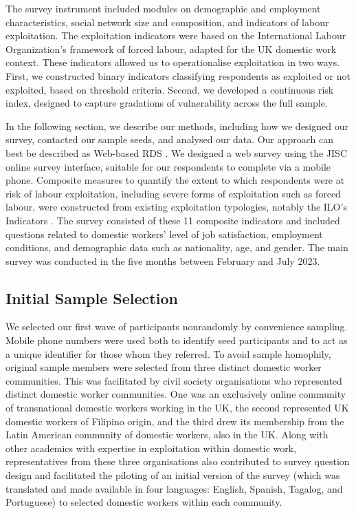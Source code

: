 \documentclass[
  12pt,
  letterpaper,
  DIV=11,
  numbers=noendperiod]{scrartcl}
\theoremstyle{plain}
\theoremstyle{definition}
\begin{document}
The survey instrument included modules on demographic and employment
characteristics, social network size and composition, and indicators of
labour exploitation. The exploitation indicators were based on the
International Labour Organization's framework of forced labour, adapted
for the UK domestic work context. These indicators allowed us to
operationalise exploitation in two ways. First, we constructed binary
indicators classifying respondents as exploited or not exploited, based
on threshold criteria. Second, we developed a continuous risk index,
designed to capture gradations of vulnerability across the full sample.

In the following section, we describe our methods, including how we
designed our survey, contacted our sample seeds, and analysed our data.
Our approach can best be described as Web-based RDS
\autocite{wejnert_web-based_2008}. We designed a web survey using the
JISC online survey interface, suitable for our respondents to complete
via a mobile phone. Composite measures to quantify the extent to which
respondents were at risk of labour exploitation, including severe forms
of exploitation such as forced labour, were constructed from existing
exploitation typologies, notably the ILO's Indicators
\autocite{ILO11-indicators}. The survey consisted of these 11 composite
indicators and included questions related to domestic workers' level of
job satisfaction, employment conditions, and demographic data such as
nationality, age, and gender. The main survey was conducted in the five
months between February and July 2023.

\subsection{Initial Sample Selection}\label{initial-sample-selection}

We selected our first wave of participants nonrandomly by convenience
sampling. Mobile phone numbers were used both to identify seed
participants and to act as a unique identifier for those whom they
referred. To avoid sample homophily, original sample members were
selected from three distinct domestic worker communities. This was
facilitated by civil society organisations who represented distinct
domestic worker communities. One was an exclusively online community of
transnational domestic workers working in the UK, the second represented
UK domestic workers of Filipino origin, and the third drew its
membership from the Latin American community of domestic workers, also
in the UK. Along with other academics with expertise in exploitation
within domestic work, representatives from these three organisations
also contributed to survey question design and facilitated the piloting
of an initial version of the survey (which was translated and made
available in four languages: English, Spanish, Tagalog, and Portuguese)
to selected domestic workers within each community.
\end{document}
